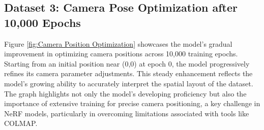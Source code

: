 \subsection{Dataset 3: Camera Pose Optimization after 10,000 Epochs}


Figure \ref{fig:Camera Position Optimization} showcases the model's gradual improvement in optimizing camera positions across 10,000 training epochs. Starting from an initial position near (0,0) at epoch 0, the model progressively refines its camera parameter adjustments. This steady enhancement reflects the model's growing ability to accurately interpret the spatial layout of the dataset. The graph highlights not only the model's developing proficiency but also the importance of extensive training for precise camera positioning, a key challenge in NeRF models, particularly in overcoming limitations associated with tools like COLMAP.

